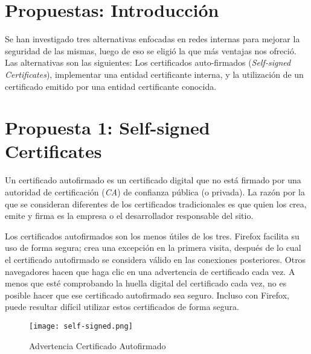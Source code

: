 
\section{Propuestas: Introducción}

Se han investigado tres alternativas enfocadas en redes internas para mejorar la seguridad de las 
mismas, luego de eso se eligió la que más ventajas nos ofreció.
Las alternativas son las siguientes: Los certificados auto-firmados (\emph{Self-signed Certificates}), implementar
una entidad certificante interna, y la utilización de un certificado emitido por una entidad
certificante conocida.

\section{Propuesta 1: Self-signed Certificates}

Un certificado autofirmado es un certificado digital que no está firmado por una 
autoridad de certificación (\emph{CA}) de confianza pública (o privada). 
La razón por la que se consideran diferentes de los certificados tradicionales es que 
quien los crea, emite y firma es la empresa o el desarrollador responsable del sitio. 

Los certificados autofirmados son los menos útiles de los tres. Firefox facilita su uso 
de forma segura; crea una excepción en la primera visita, después de lo cual el 
certificado autofirmado se considera válido en las conexiones posteriores. Otros 
navegadores hacen que haga clic en una advertencia de certificado cada vez. A menos 
que esté comprobando la huella digital del certificado cada vez, no es posible hacer 
que ese certificado autofirmado sea seguro. Incluso con Firefox, puede resultar 
difícil utilizar estos certificados de forma segura.

\begin{center}
   \begin{figure}   
      \begin{center}
         \texttt{[image: self-signed.png]}
      \end{center}
      \caption{Advertencia Certificado Autofirmado}
      \label{certSelfSigned}
   \end{figure}
\end{center}

